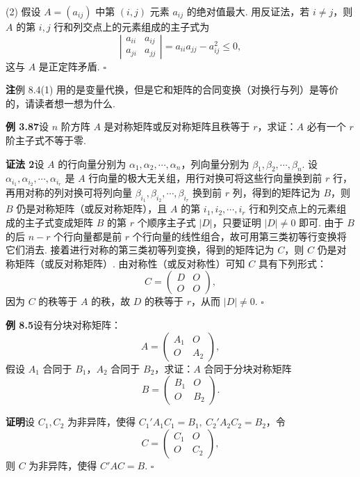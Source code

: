 \documentclass[UTF8, 12pt, fontset=fandol, oneside]{ctexart}
\begin{document}
(2) 假设 $A=(a_{ij})$ 中第 $(i,j)$ 元素 $a_{ij}$ 的绝对值最大. 用反证法，若 $i\ne j$，则 $A$ 的第 $i,j$ 行和列交点上的元素组成的主子式为
\[
\left|\begin{array}{cc}
a_{ii} & a_{ij}\\
a_{ji} & a_{jj}
\end{array}\right|=a_{ii}a_{jj}-a_{ij}^2\le 0,
\]
这与 $A$ 是正定阵矛盾. $\ensuremath{\square}$

\noindent\textbf{注}\quad 例 8.4(1) 用的是变量代换，但是它和矩阵的合同变换（对换行与列）是等价的，请读者想一想为什么.

\noindent\textbf{例 3.87}\quad 设 $n$ 阶方阵 $A$ 是对称矩阵或反对称矩阵且秩等于 $r$，求证：$A$ 必有一个 $r$ 阶主子式不等于零.

\noindent\textbf{证法 2}\quad 设 $A$ 的行向量分别为 $\alpha_1,\alpha_2,\cdots,\alpha_n$，列向量分别为 $\beta_1,\beta_2,\cdots,\beta_n$. 设 $\alpha_{i_1},\alpha_{i_2},\cdots,\alpha_{i_r}$ 是 $A$ 行向量的极大无关组，用行对换可将这些行向量换到前 $r$ 行，再用对称的列对换可将列向量 $\beta_{i_1},\beta_{i_2},\cdots,\beta_{i_r}$ 换到前 $r$ 列，得到的矩阵记为 $B$，则 $B$ 仍是对称矩阵（或反对称矩阵），且 $A$ 的第 $i_1,i_2,\cdots,i_r$ 行和列交点上的元素组成的主子式变成矩阵 $B$ 的第 $r$ 个顺序主子式 $|D|$，只要证明 $|D|\ne 0$ 即可. 由于 $B$ 的后 $n-r$ 个行向量都是前 $r$ 个行向量的线性组合，故可用第三类初等行变换将它们消去. 接着进行对称的第三类初等列变换，得到的矩阵记为 $C$，则 $C$ 仍是对称矩阵（或反对称矩阵）. 由对称性（或反对称性）可知 $C$ 具有下列形式：
\[
C=\left(\begin{array}{cc}
D & O\\
O & O
\end{array}\right),
\]
因为 $C$ 的秩等于 $A$ 的秩，故 $D$ 的秩等于 $r$，从而 $|D|\ne 0$. $\ensuremath{\square}$

\noindent\textbf{例 8.5}\quad 设有分块对称矩阵：
\[
A=\left(\begin{array}{cc}
A_1 & O\\
O & A_2
\end{array}\right),
\]
假设 $A_1$ 合同于 $B_1$，$A_2$ 合同于 $B_2$，求证：$A$ 合同于分块对称矩阵
\[
B=\left(\begin{array}{cc}
B_1 & O\\
O & B_2
\end{array}\right).
\]

\noindent\textbf{证明}\quad 设 $C_1,C_2$ 为非异阵，使得 $C_1'A_1C_1=B_1,\ C_2'A_2C_2=B_2$，令
\[
C=\left(\begin{array}{cc}
C_1 & O\\
O & C_2
\end{array}\right),
\]
则 $C$ 为非异阵，使得 $C'AC=B$. $\ensuremath{\square}$
\end{document}
